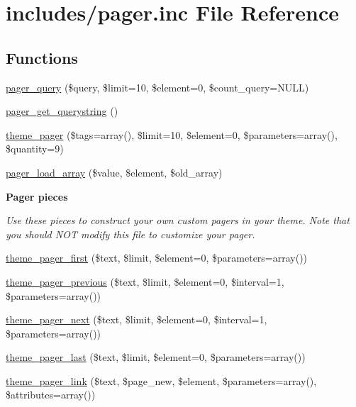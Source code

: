 \hypertarget{pager_8inc}{
\section{includes/pager.inc File Reference}
\label{pager_8inc}
}
\subsection*{Functions}
\begin{CompactItemize}
\item 
\hyperlink{group__database_ge456e13108bb88fa7a532e1cccdeaa50}{pager\_\-query} (\$query, \$limit=10, \$element=0, \$count\_\-query=NULL)
\item 
\hyperlink{pager_8inc_45070c26384d1b35761df2299e223d24}{pager\_\-get\_\-querystring} ()
\item 
\hyperlink{group__themeable_g6901a5d4e96c9b81a92b3fa2e43cfebd}{theme\_\-pager} (\$tags=array(), \$limit=10, \$element=0, \$parameters=array(), \$quantity=9)
\item 
\hyperlink{pager_8inc_0f82d7cb1702f6d160285903378a9919}{pager\_\-load\_\-array} (\$value, \$element, \$old\_\-array)
\end{CompactItemize}
\begin{Indent}{\bf Pager pieces}\par
{\em Use these pieces to construct your own custom pagers in your theme. Note that you should NOT modify this file to customize your pager. }\begin{CompactItemize}
\item 
\hyperlink{group__themeable_gbbe311616a2243c759c81e3b87ef06bf}{theme\_\-pager\_\-first} (\$text, \$limit, \$element=0, \$parameters=array())
\item 
\hyperlink{group__themeable_gd41c6c0b85a0a041610f9310fd1e39fd}{theme\_\-pager\_\-previous} (\$text, \$limit, \$element=0, \$interval=1, \$parameters=array())
\item 
\hyperlink{group__themeable_g69523320b2d45d957066b2428a19f5fa}{theme\_\-pager\_\-next} (\$text, \$limit, \$element=0, \$interval=1, \$parameters=array())
\item 
\hyperlink{group__themeable_g311db2dbb5acbda9d0938f28f161c9a8}{theme\_\-pager\_\-last} (\$text, \$limit, \$element=0, \$parameters=array())
\item 
\hyperlink{group__themeable_gecd911fe0400d240d1b93298cb83f07e}{theme\_\-pager\_\-link} (\$text, \$page\_\-new, \$element, \$parameters=array(), \$attributes=array())
\end{CompactItemize}
\end{Indent}



